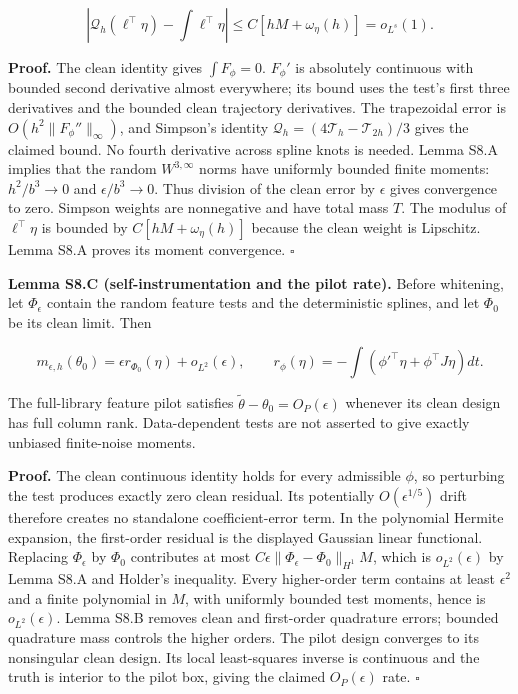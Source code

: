 \documentclass[
  american,
  11pt,
]{article}
\begin{document}
\[
|\mathcal Q_h(\ell^\top\eta)-\textstyle\int\ell^\top\eta|
\leq C[hM+\omega_\eta(h)]=o_{L^s}(1).
\]

\textbf{Proof.} The clean identity gives \(\int F_\phi=0\). \(F_\phi'\)
is absolutely continuous with bounded second derivative almost
everywhere; its bound uses the test's first three derivatives and the
bounded clean trajectory derivatives. The trapezoidal error is
\(O(h^2\|F_\phi''\|_\infty)\), and Simpson's identity
\(\mathcal Q_h=(4\mathcal T_h-\mathcal T_{2h})/3\) gives the claimed
bound. No fourth derivative across spline knots is needed. Lemma S8.A
implies that the random \(W^{3,\infty}\) norms have uniformly bounded
finite moments: \(h^2/b^3\to0\) and \(\epsilon/b^3\to0\). Thus division
of the clean error by \(\epsilon\) gives convergence to zero. Simpson
weights are nonnegative and have total mass \(T\). The modulus of
\(\ell^\top\eta\) is bounded by \(C[hM+\omega_\eta(h)]\) because the
clean weight is Lipschitz. Lemma S8.A proves its moment convergence.
\(\square\)

\textbf{Lemma S8.C (self-instrumentation and the pilot rate).} Before
whitening, let \(\Phi_\epsilon\) contain the random feature tests and
the deterministic splines, and let \(\Phi_0\) be its clean limit. Then

\[
m_{\epsilon,h}(\theta_0)
=\epsilon r_{\Phi_0}(\eta)+o_{L^2}(\epsilon),\qquad
r_\phi(\eta)=-\int(\phi'^\top\eta+\phi^\top J\eta)dt.
\]

The full-library feature pilot satisfies
\(\widetilde\theta-\theta_0=O_P(\epsilon)\) whenever its clean design
has full column rank. Data-dependent tests are not asserted to give
exactly unbiased finite-noise moments.

\textbf{Proof.} The clean continuous identity holds for every admissible
\(\phi\), so perturbing the test produces exactly zero clean residual.
Its potentially \(O(\epsilon^{1/5})\) drift therefore creates no
standalone coefficient-error term. In the polynomial Hermite expansion,
the first-order residual is the displayed Gaussian linear functional.
Replacing \(\Phi_\epsilon\) by \(\Phi_0\) contributes at most
\(C\epsilon\|\Phi_\epsilon-\Phi_0\|_{H^1}M\), which is
\(o_{L^2}(\epsilon)\) by Lemma S8.A and Holder's inequality. Every
higher-order term contains at least \(\epsilon^2\) and a finite
polynomial in \(M\), with uniformly bounded test moments, hence is
\(o_{L^2}(\epsilon)\). Lemma S8.B removes clean and first-order
quadrature errors; bounded quadrature mass controls the higher orders.
The pilot design converges to its nonsingular clean design. Its local
least-squares inverse is continuous and the truth is interior to the
pilot box, giving the claimed \(O_P(\epsilon)\) rate. \(\square\)
\end{document}
